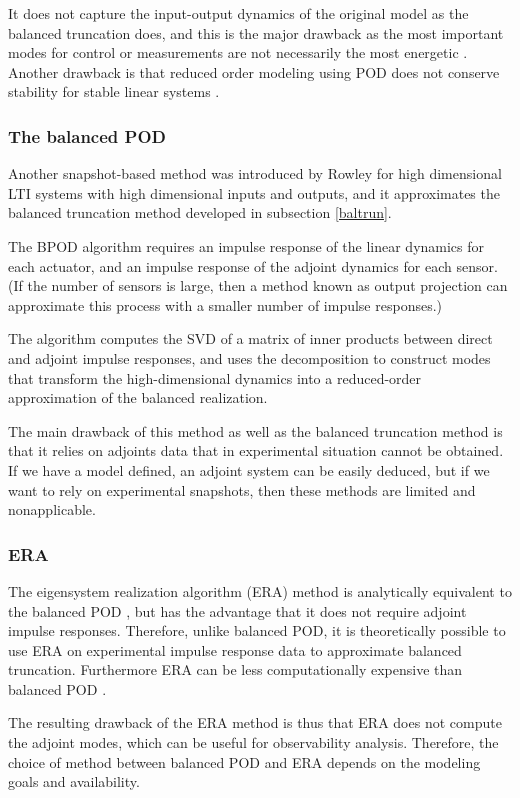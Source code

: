 \documentclass[12pt,lot, lof]{puthesis}
\begin{document}
It does not capture the input-output dynamics of the original model as the balanced truncation does, and this is the major drawback as the most important modes for control or measurements are not necessarily the most energetic \cite{Smith05, Ilak08}. Another drawback is that reduced order modeling using POD does not conserve stability for stable linear systems \cite{Smith03}.

\subsubsection{The balanced POD}
Another snapshot-based method was introduced by Rowley \cite{Rowley05} for high dimensional LTI systems with high dimensional inputs and outputs, and it approximates the balanced truncation method developed in subsection \ref{baltrun}.

The BPOD algorithm requires an impulse response of the linear dynamics for each actuator, and an impulse response of the adjoint dynamics for each sensor. (If the number of sensors is large, then a method known as output projection can approximate this process with a smaller number of impulse responses.) 

The algorithm computes the SVD of a matrix of inner products between direct and adjoint impulse responses, and uses the decomposition to construct modes that transform the high-dimensional dynamics into a reduced-order approximation of the balanced realization. 

The main drawback of this method  as well as the balanced truncation method is that it relies on adjoints data that in experimental situation cannot be obtained. If we have a model defined, an adjoint system can be easily deduced, but if we want to rely on experimental snapshots, then these methods are limited and nonapplicable. 

\subsubsection{ERA}

The eigensystem realization algorithm (ERA) method is analytically equivalent to the balanced POD \cite{Ma11}, but has the advantage that it does not require adjoint impulse responses. Therefore, unlike balanced POD, it is theoretically possible to use ERA on experimental impulse response data to approximate balanced truncation. Furthermore ERA can be less computationally expensive than balanced POD \cite{Ma11}. 

The resulting drawback of the ERA method is thus that ERA does not compute the adjoint modes, which can be useful for observability analysis. Therefore, the choice of method between balanced POD and ERA depends on the modeling goals and availability.
 
\end{document}
